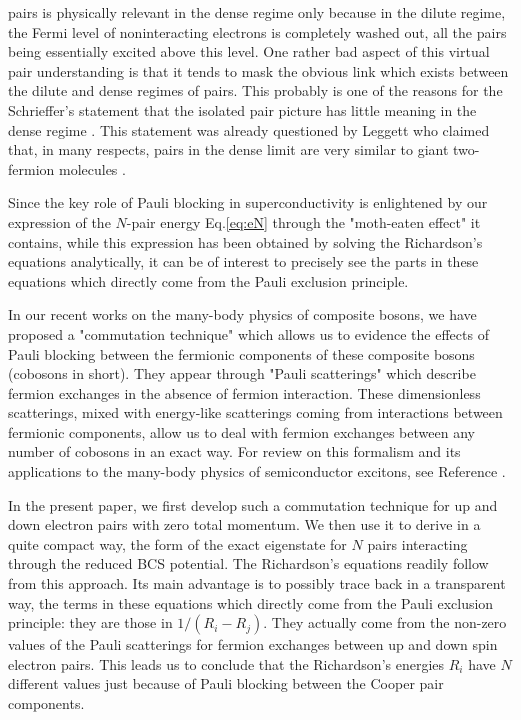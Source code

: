 \documentclass[aps,prb,superscriptaddress,twocolumn]{revtex4}
\begin{document}
pairs is physically relevant in the dense regime only because in the
dilute regime, the Fermi level of noninteracting electrons is completely
washed out, all the pairs being essentially excited above this level.
One rather bad aspect of this virtual pair understanding is that it tends to mask the obvious link which exists between the dilute and dense regimes of pairs. This probably is one of the reasons for the Schrieffer's statement that the
isolated pair picture has little meaning in the dense regime
\cite{Schrieffer}. This statement was already questioned by Leggett who
claimed that, in many respects, pairs in the dense limit are very similar to giant two-fermion
molecules \cite{LeggettCrossover}. 

Since the key role of Pauli blocking in superconductivity is enlightened by
our expression of the $N$-pair energy Eq.\eqref{eq:eN} through the "moth-eaten effect" it contains, while this expression has been obtained by solving the
Richardson's equations analytically, it can be of interest to precisely see the parts in
these equations which directly come from the Pauli exclusion principle.

In our recent works on the many-body physics of composite bosons, we have
proposed a "commutation technique" which allows us to evidence the effects
of Pauli blocking between the fermionic components of these composite
bosons (cobosons in short). They appear through "Pauli scatterings" which describe fermion
exchanges in the absence of fermion interaction. These dimensionless
scatterings, mixed with energy-like scatterings coming from interactions
between fermionic components, allow us to deal with fermion exchanges
between any number of cobosons in an exact way. For review on
this formalism and its applications to the many-body physics of
semiconductor excitons, see Reference \cite%
{CobosonPhysicsReports,CobosonCalculation}.

In the present paper, we first develop such a commutation technique for up and down
electron pairs with zero total momentum. We then use it to derive in a quite
compact way, the form of the exact eigenstate for $N$ pairs interacting
through the reduced BCS potential. The Richardson's equations readily follow
from this approach. Its main advantage is to possibly trace back in a
transparent way, the terms in these equations which directly come from the
Pauli exclusion principle: they are those in $1/(R_i-R_j)$. They actually come
from the non-zero values of the Pauli scatterings for fermion exchanges between up and down spin electron pairs. This leads us to conclude that the Richardson's energies $R_i$  have $N$ different values just because of Pauli blocking between the Cooper pair components.
\end{document}
